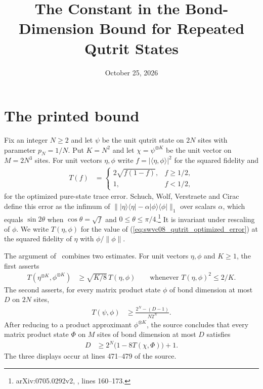 \documentclass{article}
\title{The Constant in the Bond-Dimension Bound\newline
for Repeated Qutrit States}
\author{}
\date{October 25, 2026}
\begin{document}
\maketitle
{}

\section{The printed bound}

Fix an integer $N\ge2$ and let $\psi$ be the unit qutrit state on $2N$ sites
with parameter $p_N=1/N$. Put $K=N^2$ and let $\chi=\psi^{\otimes K}$ be the
unit vector on $M=2N^3$ sites. For unit vectors $\eta,\phi$ write
$f=|\langle\eta,\phi\rangle|^2$ for the squared fidelity and
\begin{align}
    T(f) & =
    \begin{cases}
        2\sqrt{f(1-f)}, & f\ge1/2, \\
        1,              & f<1/2,
    \end{cases}
    \label{eq:swvc08_qutrit_optimized_error}
\end{align}
for the optimized pure-state trace error. Schuch, Wolf, Verstraete and
Cirac~\cite{Schuch2008EntropyScaling} define this error as the infimum of
$\lVert|\eta\rangle\langle\eta|-\alpha|\phi\rangle\langle\phi|\rVert_1$ over
scalars $\alpha$, which equals $\sin2\theta$ when $\cos\theta=\sqrt f$ and
$0\le\theta\le\pi/4$.\footnote{arXiv:0705.0292v2, ,
    lines 160--173.}
It is invariant under rescaling of $\phi$.
We write $T(\eta,\phi)$ for the value of
(\ref{eq:swvc08_qutrit_optimized_error}) at the squared fidelity of $\eta$
with $\phi/\lVert\phi\rVert$.

The argument of~\cite{Schuch2008EntropyScaling} combines two estimates. For
unit vectors $\eta,\phi$ and $K\ge1$, the first asserts
\begin{align}
    T(\eta^{\otimes K},\phi^{\otimes K})
     & \ge\sqrt{K/8}\,T(\eta,\phi)
    \qquad\text{whenever }T(\eta,\phi)^2\le2/K.
    \label{eq:swvc08_qutrit_printed_amplification}
\end{align}
The second asserts, for every matrix product state $\phi$ of bond dimension
at most $D$ on $2N$ sites,
\begin{align}
    T(\psi,\phi) & \ge\frac{2^N-(D-1)}{N2^N}.
    \label{eq:swvc08_qutrit_single_copy}
\end{align}
After reducing to a product approximant $\phi^{\otimes K}$, the source
concludes that every matrix product state $\Phi$ on $M$ sites of bond
dimension at most $D$ satisfies
\begin{align}
    D & \ge2^N\bigl(1-8T(\chi,\Phi)\bigr)+1.
    \label{eq:swvc08_qutrit_printed_bound}
\end{align}
The three displays occur at lines 471--479 of the source.
\end{document}
